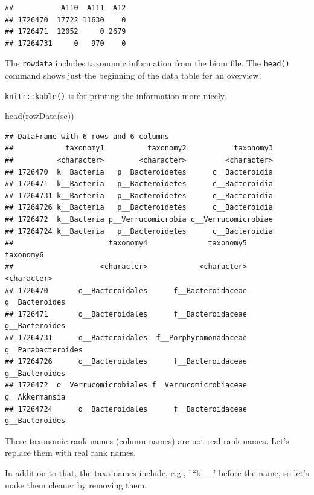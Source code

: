 \documentclass[
]{book}
\newenvironment{Shaded}{\begin{snugshade}}{\end{snugshade}}
\newcommand{\FunctionTok}[1]{\textcolor[rgb]{0.00,0.00,0.00}{#1}}
\newcommand{\NormalTok}[1]{#1}
\begin{document}
\begin{verbatim}
##           A110  A111  A12
## 1726470  17722 11630    0
## 1726471  12052     0 2679
## 17264731     0   970    0
\end{verbatim}

The \texttt{rowdata} includes taxonomic information from the biom file. The \texttt{head()} command
shows just the beginning of the data table for an overview.

\texttt{knitr::kable()} is for printing the information more nicely.

\begin{Shaded}
\begin{Highlighting}[]
\FunctionTok{head}\NormalTok{(}\FunctionTok{rowData}\NormalTok{(se))}
\end{Highlighting}
\end{Shaded}

\begin{verbatim}
## DataFrame with 6 rows and 6 columns
##            taxonomy1          taxonomy2           taxonomy3
##          <character>        <character>         <character>
## 1726470  k__Bacteria   p__Bacteroidetes      c__Bacteroidia
## 1726471  k__Bacteria   p__Bacteroidetes      c__Bacteroidia
## 17264731 k__Bacteria   p__Bacteroidetes      c__Bacteroidia
## 17264726 k__Bacteria   p__Bacteroidetes      c__Bacteroidia
## 1726472  k__Bacteria p__Verrucomicrobia c__Verrucomicrobiae
## 17264724 k__Bacteria   p__Bacteroidetes      c__Bacteroidia
##                      taxonomy4              taxonomy5          taxonomy6
##                    <character>            <character>        <character>
## 1726470       o__Bacteroidales      f__Bacteroidaceae     g__Bacteroides
## 1726471       o__Bacteroidales      f__Bacteroidaceae     g__Bacteroides
## 17264731      o__Bacteroidales  f__Porphyromonadaceae g__Parabacteroides
## 17264726      o__Bacteroidales      f__Bacteroidaceae     g__Bacteroides
## 1726472  o__Verrucomicrobiales f__Verrucomicrobiaceae     g__Akkermansia
## 17264724      o__Bacteroidales      f__Bacteroidaceae     g__Bacteroides
\end{verbatim}

These taxonomic rank names (column names) are not real rank
names. Let's replace them with real rank names.

In addition to that, the taxa names include, e.g., '\,``k\_\_' before the name, so let's
make them cleaner by removing them.
\end{document}
